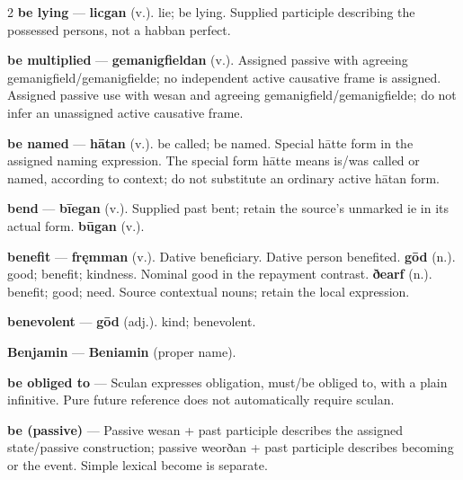 \begin{multicols}{2}
\textbf{be lying} — \textbf{licgan} (v.). lie; be lying. Supplied participle describing the possessed persons, not a habban perfect.\par
\textbf{be multiplied} — \textbf{gemanigfieldan} (v.). Assigned passive with agreeing gemanigfield/gemanigfielde; no independent active causative frame is assigned. Assigned passive use with wesan and agreeing gemanigfield/gemanigfielde; do not infer an unassigned active causative frame.\par
\textbf{be named} — \textbf{hātan} (v.). be called; be named. Special hātte form in the assigned naming expression. The special form hātte means is/was called or named, according to context; do not substitute an ordinary active hātan form.\par
\textbf{bend} — \textbf{bīegan} (v.). Supplied past bent; retain the source's unmarked ie in its actual form. \textbf{būgan} (v.).\par
\textbf{benefit} — \textbf{fręmman} (v.). Dative beneficiary. Dative person benefited. \textbf{gōd} (n.). good; benefit; kindness. Nominal good in the repayment contrast. \textbf{ðearf} (n.). benefit; good; need. Source contextual nouns; retain the local expression.\par
\textbf{benevolent} — \textbf{gōd} (adj.). kind; benevolent.\par
\textbf{Benjamin} — \textbf{Beniamin} (proper name).\par
\textbf{be obliged to} — Sculan expresses obligation, must/be obliged to, with a plain infinitive. Pure future reference does not automatically require sculan.\par
\textbf{be (passive)} — Passive wesan + past participle describes the assigned state/passive construction; passive weorðan + past participle describes becoming or the event. Simple lexical become is separate.\par

\end{multicols}

